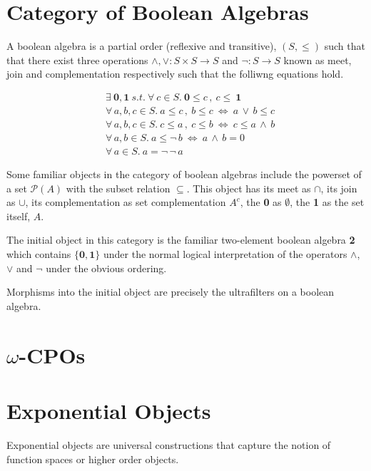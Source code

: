 \documentclass[a4paper,12pt]{article}
\begin{document}
\section{Category of Boolean Algebras}
A boolean algebra is a partial order (reflexive and transitive), $(S, \leq)$ such that that
there exist three operations $\land, \lor: S\times S \rightarrow S$  and $\neg:
S \rightarrow S$ known as meet, join and complementation respectively such that
the folliwng equations hold.

\begin{align*}
    &\exists \ \textbf{0}, \textbf{1} \ s.t. \ \forall \ c \in S. \ \textbf{0}
    \leq c \, , \ c \leq \ \textbf{1} \\
    &\forall \, a, b, c \in S. \ a \leq c \, , \ b \leq c \ \Leftrightarrow \ a \,
    \lor \, b \leq c \\
    &\forall \, a, b, c  \in S. \ c \leq a \, , \ c \leq b \ \Leftrightarrow \ c
    \leq a \, \land \, b \\
    &\forall \, a, b \in S. \ a \leq \neg \, b \ \Leftrightarrow \ a \, \land \,
    b = 0 \\
    &\forall \, a \in S. \   a = \neg \, \neg \, a
\end{align*}

Some familiar objects in the category of boolean algebras include the powerset
of a set $\mathcal{P}(A)$ with the subset relation $\subseteq$. This object has
its meet as $\cap$, its join as $\cup$, its complementation as set
complementation $A^c$, the \textbf{0} as $\emptyset$, the \textbf{1} as the set
itself, $A$.

The initial object in this category is the familiar two-element boolean algebra
\textbf{2} which contains $ \{\textbf{0}, \textbf{1}\}$ under the normal logical
interpretation of the operators $\land$, $\lor$ and $\neg$ under the obvious
ordering.


Morphisms into the initial object are precisely the ultrafilters on a boolean
algebra.


\section{$\omega$-CPOs}

\section{Exponential Objects}
Exponential objects are universal constructions that capture the notion of
function spaces or higher order objects.
\end{document}
